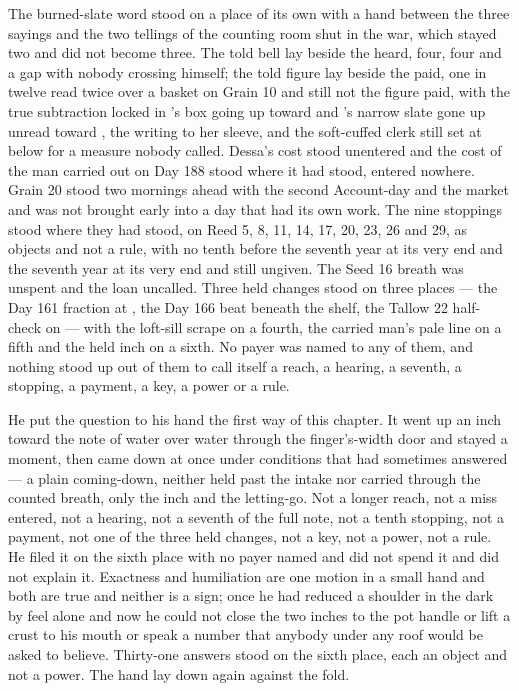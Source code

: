 The burned-slate word stood on a place of its own with a hand between the three sayings and the two tellings of the counting room shut in the war, which stayed two and did not become three. The told bell lay beside the heard, four, four and a gap with nobody crossing himself; the told figure lay beside the paid, one in twelve read twice over a basket on Grain 10 and still not the figure paid, with the true subtraction locked in 's box going up toward  and 's narrow slate gone up unread toward , the writing to her sleeve, and the soft-cuffed clerk still set at  below  for a measure nobody called. Dessa's cost stood unentered and the cost of the man carried out on Day 188 stood where it had stood, entered nowhere. Grain 20 stood two mornings ahead with the second Account-day and the market and was not brought early into a day that had its own work. The nine stoppings stood where they had stood, on Reed 5, 8, 11, 14, 17, 20, 23, 26 and 29, as objects and not a rule, with no tenth before the seventh year at its very end and the seventh year at its very end and still ungiven. The Seed 16 breath was unspent and the loan uncalled. Three held changes stood on three places --- the Day 161 fraction at , the Day 166 beat beneath the shelf, the Tallow 22 half-check on  --- with the loft-sill scrape on a fourth, the carried man's pale line on a fifth and the held inch on a sixth. No payer was named to any of them, and nothing stood up out of them to call itself a reach, a hearing, a seventh, a stopping, a payment, a key, a power or a rule.

He put the question to his hand the first way of this chapter. It went up an inch toward the note of water over water through the finger's-width door and stayed a moment, then came down at once under conditions that had sometimes answered --- a plain coming-down, neither held past the intake nor carried through the counted breath, only the inch and the letting-go. Not a longer reach, not a miss entered, not a hearing, not a seventh of the full note, not a tenth stopping, not a payment, not one of the three held changes, not a key, not a power, not a rule. He filed it on the sixth place with no payer named and did not spend it and did not explain it. Exactness and humiliation are one motion in a small hand and both are true and neither is a sign; once he had reduced a shoulder in the dark by feel alone and now he could not close the two inches to the pot handle or lift a crust to his mouth or speak a number that anybody under any roof would be asked to believe. Thirty-one answers stood on the sixth place, each an object and not a power. The hand lay down again against the fold.

